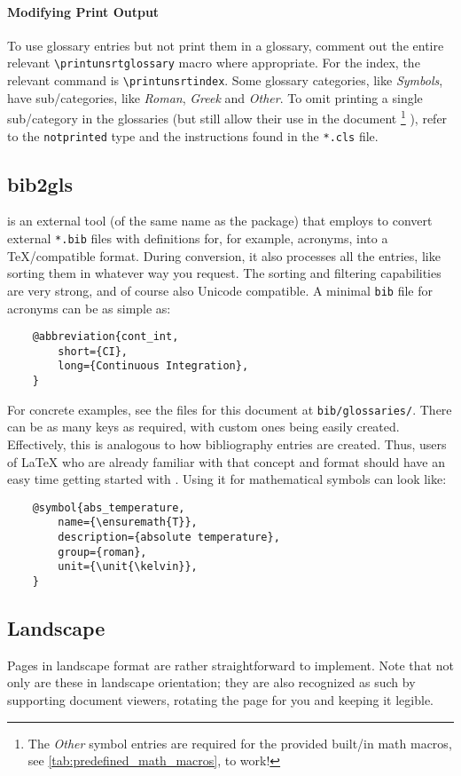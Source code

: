 \paragraph{Modifying Print Output}
To use glossary entries but not print them in a glossary, comment out the entire
relevant \verb|\printunsrtglossary| macro where appropriate.
For the index, the relevant command is \verb|\printunsrtindex|.
Some glossary categories, like \emph{Symbols}, have sub\-/categories, like \emph{Roman},
\emph{Greek} and \emph{Other}.
To omit printing a single sub\-/category in the glossaries (but still allow their use
in the document%
\footnote{
    The \emph{Other} symbol entries are required for the provided built\-/in math
    macros, see \cref{tab:predefined_math_macros}, to work!%
}%
), refer to the \texttt{notprinted} type and the instructions found in the \texttt{*.cls}
file.

\subsection{bib2gls}
\label{ch:bib2gls}

 is an external tool (of the same name as the package) that
 employs to convert external \texttt{*.bib} files with
definitions for, for example, acronyms, into a \TeX{}\-/compatible format.
During conversion, it also processes all the entries, like sorting them in whatever
way you request.
The sorting and filtering capabilities are very strong, and of course also Unicode
compatible.
A minimal \texttt{bib} file for acronyms can be as simple as:
\begin{verbatim}
    @abbreviation{cont_int,
        short={CI},
        long={Continuous Integration},
    }
\end{verbatim}
For concrete examples, see the files for this document at \texttt{bib/glossaries/}.
There can be as many keys as required, with custom ones being easily created.
Effectively, this is analogous to how bibliography entries are created.
Thus, users of \LaTeX{} who are already familiar with that concept and format
should have an easy time getting started with .
Using it for mathematical symbols can look like:
\begin{verbatim}
    @symbol{abs_temperature,
        name={\ensuremath{T}},
        description={absolute temperature},
        group={roman},
        unit={\unit{\kelvin}},
    }
\end{verbatim}

\begin{landscape}
    \section{Landscape}

    Pages in landscape format are rather straightforward to implement.
    Note that not only are these in landscape orientation; they are also recognized
    as such by supporting document viewers, rotating the page for you and keeping
    it legible.
\end{landscape}
